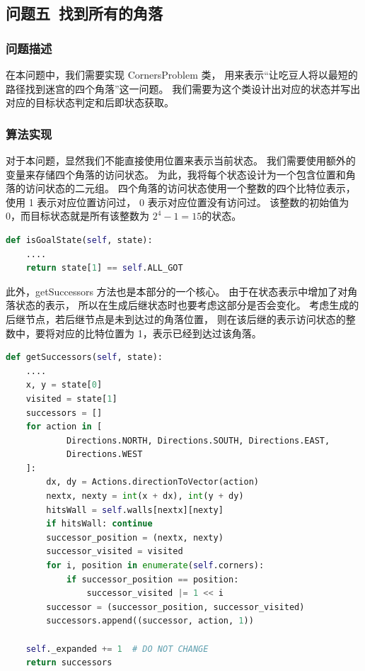 \documentclass[12pt,onecolumn]{report}
\theoremstyle{plain}
\numberwithin{figure}{section}
\begin{document}
\subsection{问题五~找到所有的角落}
\subsubsection{问题描述}
在本问题中，我们需要实现 CornersProblem 类，
用来表示“让吃豆人将以最短的路径找到迷宫的四个角落”这一问题。
我们需要为这个类设计出对应的状态并写出对应的目标状态判定和后即状态获取。

\subsubsection{算法实现}
对于本问题，显然我们不能直接使用位置来表示当前状态。
我们需要使用额外的变量来存储四个角落的访问状态。
为此，我将每个状态设计为一个包含位置和角落的访问状态的二元组。
四个角落的访问状态使用一个整数的四个比特位表示，
使用 1 表示对应位置访问过， 0 表示对应位置没有访问过。
该整数的初始值为 0，而目标状态就是所有该整数为 $2^{4} - 1 = 15$的状态。

\begin{lstlisting}[language=python]
def isGoalState(self, state):
    ....
    return state[1] == self.ALL_GOT
\end{lstlisting}

此外，getSuccessors 方法也是本部分的一个核心。
由于在状态表示中增加了对角落状态的表示，
所以在生成后继状态时也要考虑这部分是否会变化。
考虑生成的后继节点，若后继节点是未到达过的角落位置，
则在该后继的表示访问状态的整数中，要将对应的比特位置为 1，表示已经到达过该角落。

\begin{lstlisting}[language=python]
def getSuccessors(self, state):
    ....
    x, y = state[0]
    visited = state[1]
    successors = []
    for action in [
            Directions.NORTH, Directions.SOUTH, Directions.EAST,
            Directions.WEST
    ]:
        dx, dy = Actions.directionToVector(action)
        nextx, nexty = int(x + dx), int(y + dy)
        hitsWall = self.walls[nextx][nexty]
        if hitsWall: continue
        successor_position = (nextx, nexty)
        successor_visited = visited
        for i, position in enumerate(self.corners):
            if successor_position == position:
                successor_visited |= 1 << i
        successor = (successor_position, successor_visited)
        successors.append((successor, action, 1))

    self._expanded += 1  # DO NOT CHANGE
    return successors
\end{lstlisting}
\end{document}
